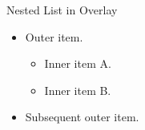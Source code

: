\documentclass[14pt,t]{beamer}
\begin{document}
\begin{frame}{Nested List in Overlay}
\begin{itemize}
\item<1-> Outer item.
  \begin{itemize}
  \item Inner item A.
  \item Inner item B.
  \end{itemize}
\item<2-> Subsequent outer item.
\end{itemize}
\end{frame}
\end{document}
